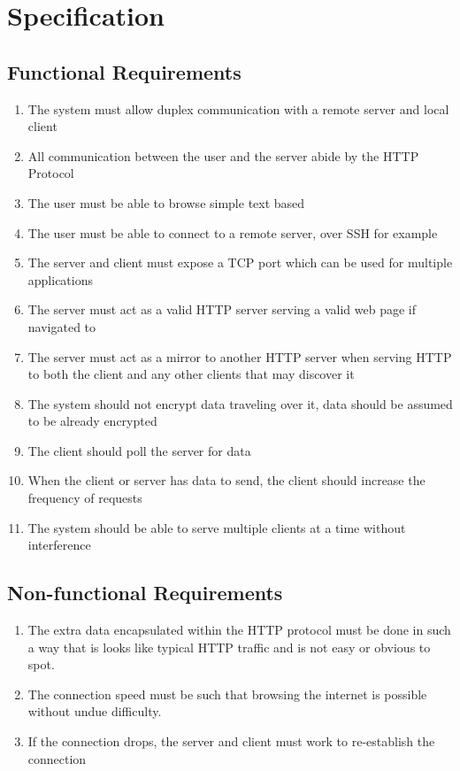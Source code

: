 \section{Specification}
\subsection{Functional Requirements}
\begin{enumerate}
    \item The system must allow duplex communication with a remote server and local client
    \item All communication between the user and the server abide by the HTTP Protocol
    \item The user must be able to browse simple text based 
    \item The user must be able to connect to a remote server, over SSH for example
    \item The server and client must expose a TCP port which can be used for multiple applications
    \item The server must act as a valid HTTP server serving a valid web page if navigated to
    \item The server must act as a mirror to another HTTP server when serving HTTP to both the client and any other clients that may discover it
    \item The system should not encrypt data traveling over it, data should be assumed to be already encrypted
    \item The client should poll the server for data
    \item When the client or server has data to send, the client should increase the frequency of requests
    \item The system should be able to serve multiple clients at a time without interference
\end{enumerate}
\subsection{Non-functional Requirements}
\begin{enumerate}
    \item The extra data encapsulated within the HTTP protocol must be done in such a way that is looks like typical HTTP traffic and is not easy or obvious to spot.
    \item The connection speed must be such that browsing the internet is possible without undue difficulty.
    \item If the connection drops, the server and client must work to re-establish the connection
\end{enumerate}
